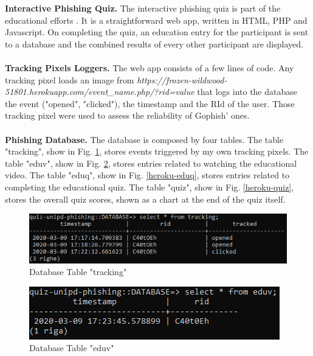 \documentclass[a4paper]{article}
\begin{document}
\noindent
\textbf{Interactive Phishing Quiz.} The interactive phishing quiz is part of the educational efforts \cite{tools-unipd-phishing-quiz}. It is a straightforward web app, written in HTML, PHP and Javascript. On completing the quiz, an education entry for the participant is sent to a database and the combined results of every other participant are displayed.
\\ \\
\textbf{Tracking Pixels Loggers.} The web app consists of a few lines of code. Any tracking pixel loads an image from \textit{https://frozen-wildwood-51801.herokuapp.com/event\_name.php/?rid=value} that logs into the database the event ("opened", "clicked"), the timestamp and the RId of the user. Those tracking pixel were used to assess the reliability of Gophish' ones.
\\ \\
\textbf{Phishing Database.} The database is composed by four tables. The table "tracking", show in Fig. \ref{heroku-tracking}, stores events triggered by my own tracking pixels. The table "eduv", show in Fig. \ref{heroku-eduv}, stores entries related to watching the educational video. The table "eduq", show in Fig. \ref{heroku-eduq}, stores entries related to completing the educational quiz. The table "quiz", show in Fig. \ref{heroku-quiz}, stores the overall quiz scores, shown as a chart at the end of the quiz itself.

\bigskip

\begin{figure}[H]
	\centering
	\includegraphics[scale=0.6]{images/tools/database-tracking.PNG}
	\caption{Database Table "tracking"}
	\label{heroku-tracking}
\end{figure}

\begin{figure}[H]
	\centering
	\includegraphics[scale=0.7]{images/tools/database-eduv.PNG}
	\caption{Database Table "eduv"}
	\label{heroku-eduv}
\end{figure}
\end{document}
